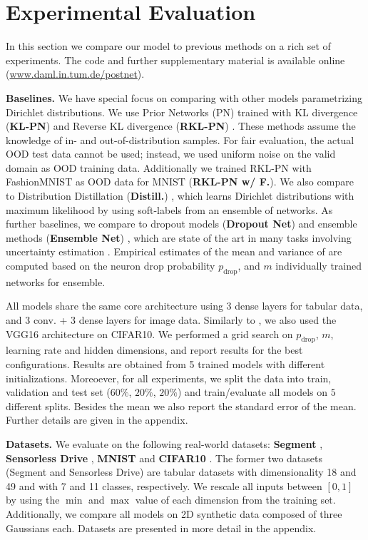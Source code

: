 \section{Experimental Evaluation}
\label{sec:experiments_006}

In this section we compare our model to previous methods on a rich set of experiments. The code and further supplementary material is available online (\url{www.daml.in.tum.de/postnet}).

\textbf{Baselines.} We have special focus on comparing with other models parametrizing Dirichlet distributions. We use Prior Networks (PN) trained with KL divergence (\textbf{KL-PN}) \cite{prior_net} and Reverse KL divergence (\textbf{RKL-PN}) \cite{rev_kl_prior_net}. These methods assume the knowledge of in- and out-of-distribution samples. For fair evaluation, the actual OOD test data cannot be used; instead, we used uniform noise on the valid domain as OOD training data. Additionally we trained RKL-PN with FashionMNIST as OOD data for MNIST (\textbf{RKL-PN w/ F.}). We also compare to Distribution Distillation (\textbf{Distill.}) \cite{distribution_distillation}, which learns Dirichlet distributions with maximum likelihood by using soft-labels from an ensemble of networks. 
As further baselines, we compare to dropout models (\textbf{Dropout Net}) \cite{drop_out} and ensemble methods (\textbf{Ensemble Net}) \cite{ensemble_simple}, which are state of the art in many tasks involving uncertainty estimation \cite{uncertainty_survey}. Empirical estimates of the mean and variance of  are computed based on the neuron drop probability $p_{\text{drop}}$, and $m$ individually trained networks for ensemble.

All models share the same core architecture using 3 dense layers for tabular data, and 3 conv. + 3 dense layers for image data. Similarly to \cite{prior_net, rev_kl_prior_net}, we also used the VGG16 architecture \cite{vgg} on CIFAR10. We performed a grid search on $p_{\text{drop}}$, $m$, learning rate and hidden dimensions, and report results for the best configurations. Results are obtained from 5 trained models with different initializations.
Moreoever, for all experiments, we split the data into train, validation and test set  ($60\%$, $20\%$, $20\%$) and train/evaluate all models on $5$ different splits. Besides the mean we also report the standard error of the mean. Further details are given in the appendix.

\textbf{Datasets.} We evaluate on the following real-world datasets: \textbf{Segment} \cite{uci_datasets}, \textbf{Sensorless Drive} \cite{uci_datasets}, \textbf{MNIST} \cite{mnist} and \textbf{CIFAR10} \cite{cifar10}. The former two datasets (Segment and Sensorless Drive) are tabular datasets with %
dimensionality 18 and 49 and with 7 and 11 classes, respectively. We rescale all inputs between $[0, 1]$ by using the $\min$ and $\max$ value of each dimension from the training set. Additionally, we compare all models on 2D synthetic data composed of three Gaussians each. Datasets are presented in  more detail in the appendix.

